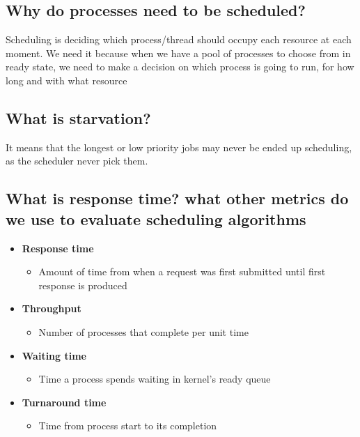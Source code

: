 \documentclass[a4paper]{article}
\begin{document}
\subsection{Why do processes need to be scheduled?} %
\label{sub:Why do processes need to be scheduled?}
Scheduling is deciding which process/thread should occupy each resource at each moment. We need it because when we have a pool
of processes to choose from in ready state, we need to make a decision on which process is going to run, for how long and with
what resource
\subsection{What is starvation?} %
\label{sub:What is starvation?}
It means that the longest or low priority jobs may never be ended up scheduling, as the scheduler never pick them.
\subsection{What is response time? what other metrics do we use to evaluate scheduling algorithms} %
\label{sub:What is response time? what other metrics do we use to evaluate scheduling algorithms?}
\begin{itemize}
  \item {\bf Response time}
    \begin{itemize}
      \item Amount of time from when a request was first submitted until first response is produced
    \end{itemize}
  \item {\bf Throughput}
    \begin{itemize}
      \item Number of processes that complete per unit time
    \end{itemize}
  \item {\bf Waiting time}
    \begin{itemize}
      \item Time a process spends waiting in kernel's ready queue
    \end{itemize}
  \item {\bf Turnaround time}
    \begin{itemize}
      \item Time from process start to its completion
    \end{itemize}
\end{itemize}
\end{document}
